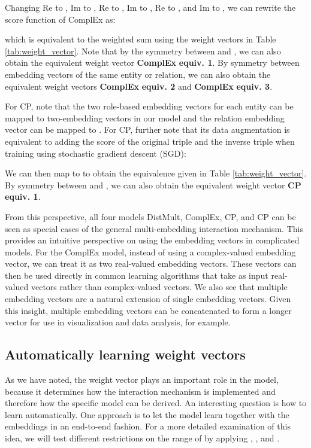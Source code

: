 \documentclass[sigconf,edbt]{acmart-edbt2019}
\begin{document}
Changing Re to , Im to , Re to , Im to , Re to , and Im to , we can rewrite the score function of ComplEx as:

which is equivalent to the weighted sum using the weight vectors in Table \ref{tab:weight_vector}. Note that by the symmetry between  and , we can also obtain the equivalent weight vector \textbf{ComplEx} \textbf{equiv. 1}. By symmetry between embedding vectors of the same entity or relation, we can also obtain the equivalent weight vectors \textbf{ComplEx} \textbf{equiv. 2} and \textbf{ComplEx} \textbf{equiv. 3}.

For CP, note that the two role-based embedding vectors for each entity can be mapped to two-embedding vectors in our model and the relation embedding vector can be mapped to . For CP, further note that its data augmentation is equivalent to adding the score of the original triple and the inverse triple when training using stochastic gradient descent (SGD):

We can then map  to  to obtain the equivalence given in Table \ref{tab:weight_vector}. By symmetry between  and , we can also obtain the equivalent weight vector \textbf{CP} \textbf{equiv. 1}.

From this perspective, all four models DistMult, ComplEx, CP, and CP can be seen as special cases of the general multi-embedding interaction mechanism. This provides an intuitive perspective on using the embedding vectors in complicated models. For the ComplEx model, instead of using a complex-valued embedding vector, we can treat it as two real-valued embedding vectors. These vectors can then be used directly in common learning algorithms that take as input real-valued vectors rather than complex-valued vectors. We also see that multiple embedding vectors are a natural extension of single embedding vectors. Given this insight, multiple embedding vectors can be concatenated to form a longer vector for use in visualization and data analysis, for example.


\subsection{Automatically learning weight vectors}
As we have noted, the weight vector  plays an important role in the model, because it determines how the interaction mechanism is implemented and therefore how the specific model can be derived. An interesting question is how to learn  automatically. One approach is to let the model learn  together with the embeddings in an end-to-end fashion. For a more detailed examination of this idea, we will test different restrictions on the range of  by applying , , and .
\end{document}

